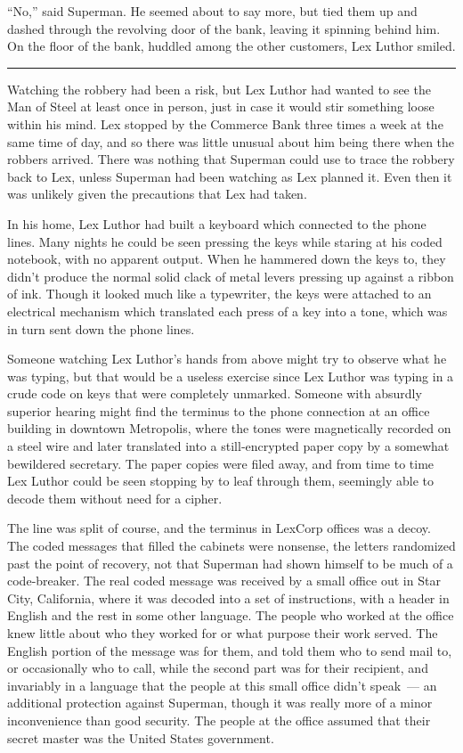\documentclass[ebook,12pt]{memoir}
\begin{document}
``No,'' said Superman. He seemed about to say more, but tied them up and
dashed through the revolving door of the bank, leaving it spinning
behind him. On the floor of the bank, huddled among the other customers,
Lex Luthor smiled.

\begin{center}\rule{0.5\linewidth}{\linethickness}\end{center}

Watching the robbery had been a risk, but Lex Luthor had wanted to see
the Man of Steel at least once in person, just in case it would stir
something loose within his mind. Lex stopped by the Commerce Bank three
times a week at the same time of day, and so there was little unusual
about him being there when the robbers arrived. There was nothing that
Superman could use to trace the robbery back to Lex, unless Superman had
been watching as Lex planned it. Even then it was unlikely given the
precautions that Lex had taken.

In his home, Lex Luthor had built a keyboard which connected to the
phone lines. Many nights he could be seen pressing the keys while
staring at his coded notebook, with no apparent output. When he hammered
down the keys to, they didn't produce the normal solid clack of metal
levers pressing up against a ribbon of ink. Though it looked much like a
typewriter, the keys were attached to an electrical mechanism which
translated each press of a key into a tone, which was in turn sent down
the phone lines.

Someone watching Lex Luthor's hands from above might try to observe what
he was typing, but that would be a useless exercise since Lex Luthor was
typing in a crude code on keys that were completely unmarked. Someone
with absurdly superior hearing might find the terminus to the phone
connection at an office building in downtown Metropolis, where the tones
were magnetically recorded on a steel wire and later translated into a
still‐encrypted paper copy by a somewhat bewildered secretary. The paper
copies were filed away, and from time to time Lex Luthor could be seen
stopping by to leaf through them, seemingly able to decode them without
need for a cipher.

The line was split of course, and the terminus in LexCorp offices was a
decoy. The coded messages that filled the cabinets were nonsense, the
letters randomized past the point of recovery, not that Superman had
shown himself to be much of a code‐breaker. The real coded message was
received by a small office out in Star City, California, where it was
decoded into a set of instructions, with a header in English and the
rest in some other language. The people who worked at the office knew
little about who they worked for or what purpose their work served. The
English portion of the message was for them, and told them who to send
mail to, or occasionally who to call, while the second part was for
their recipient, and invariably in a language that the people at this
small office didn't speak~--- an additional protection against Superman,
though it was really more of a minor inconvenience than good security.
The people at the office assumed that their secret master was the United
States government.
\end{document}
